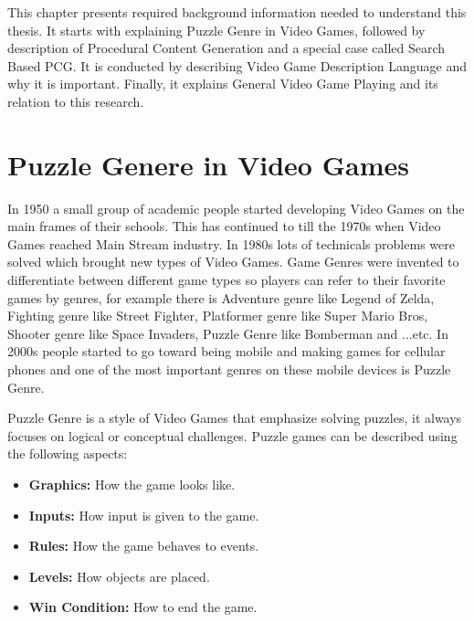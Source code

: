 This chapter presents required background information needed to understand this thesis. It starts with explaining Puzzle Genre in Video Games, followed by description of Procedural Content Generation and a special case called Search Based PCG. It is conducted by describing Video Game Description Language and why it is important. Finally, it explains General Video Game Playing and its relation to this research.

\section{Puzzle Genere in Video Games}
In 1950 a small group of academic people started developing Video Games on the main frames of their schools. This has continued to till the 1970s when Video Games reached Main Stream industry. In 1980s lots of technicals problems were solved which brought new types of Video Games. Game Genres were invented to differentiate between different game types so players can refer to their favorite games by genres, for example there is Adventure genre like Legend of Zelda, Fighting genre like Street Fighter, Platformer genre like Super Mario Bros, Shooter genre like Space Invaders, Puzzle Genre like Bomberman and ...etc. In 2000s people started to go toward being mobile and making games for cellular  phones and one of the most important genres on these mobile devices is Puzzle Genre\cite{pcgHistory}.\\\par

Puzzle Genre is a style of Video Games that emphasize solving puzzles, it always focuses on logical or conceptual challenges. Puzzle games can be described using the following aspects:
\begin{itemize} \itemsep0pt \parskip0pt 
	\item \textbf{Graphics:} How the game looks like.
  	\item \textbf{Inputs:} How input is given to the game.
  	\item \textbf{Rules:} How the game behaves to events.
  	\item \textbf{Levels:} How objects are placed.
  	\item \textbf{Win Condition:} How to end the game.
\end{itemize}

